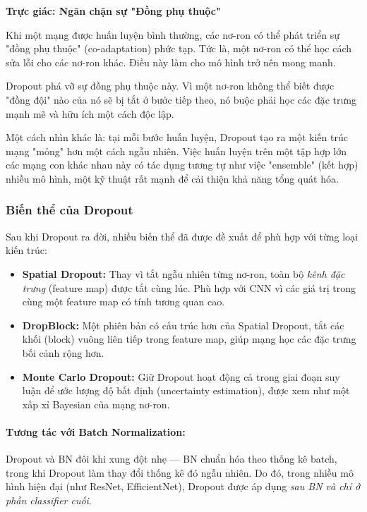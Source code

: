 \begin{mdframed}[style=infobox]
	\textbf{Trực giác: Ngăn chặn sự "Đồng phụ thuộc"}
	
	Khi một mạng được huấn luyện bình thường, các nơ-ron có thể phát triển sự "đồng phụ thuộc" (co-adaptation) phức tạp. Tức là, một nơ-ron có thể học cách sửa lỗi cho các nơ-ron khác. Điều này làm cho mô hình trở nên mong manh.
	
	Dropout phá vỡ sự đồng phụ thuộc này. Vì một nơ-ron không thể biết được "đồng đội" nào của nó sẽ bị tắt ở bước tiếp theo, nó buộc phải học các đặc trưng mạnh mẽ và hữu ích một cách độc lập.
	
	Một cách nhìn khác là: tại mỗi bước huấn luyện, Dropout tạo ra một kiến trúc mạng "mỏng" hơn một cách ngẫu nhiên. Việc huấn luyện trên một tập hợp lớn các mạng con khác nhau này có tác dụng tương tự như việc "ensemble" (kết hợp) nhiều mô hình, một kỹ thuật rất mạnh để cải thiện khả năng tổng quát hóa.
\end{mdframed}

\subsubsection{Biến thể của Dropout}
Sau khi Dropout ra đời, nhiều biến thể đã được đề xuất để phù hợp với từng loại kiến trúc:

\begin{itemize}
	\item \textbf{Spatial Dropout:} Thay vì tắt ngẫu nhiên từng nơ-ron, toàn bộ \textit{kênh đặc trưng} (feature map) được tắt cùng lúc. Phù hợp với CNN vì các giá trị trong cùng một feature map có tính tương quan cao.
	\item \textbf{DropBlock:} Một phiên bản có cấu trúc hơn của Spatial Dropout, tắt các khối (block) vuông liên tiếp trong feature map, giúp mạng học các đặc trưng bối cảnh rộng hơn.
	\item \textbf{Monte Carlo Dropout:} Giữ Dropout hoạt động cả trong giai đoạn suy luận để ước lượng độ bất định (uncertainty estimation), được xem như một xấp xỉ Bayesian của mạng nơ-ron.
\end{itemize}

\paragraph{Tương tác với Batch Normalization:}
Dropout và BN đôi khi xung đột nhẹ — BN chuẩn hóa theo thống kê batch, trong khi Dropout làm thay đổi thống kê đó ngẫu nhiên. 
Do đó, trong nhiều mô hình hiện đại (như ResNet, EfficientNet), Dropout được áp dụng \textit{sau BN và chỉ ở phần classifier cuối}.

